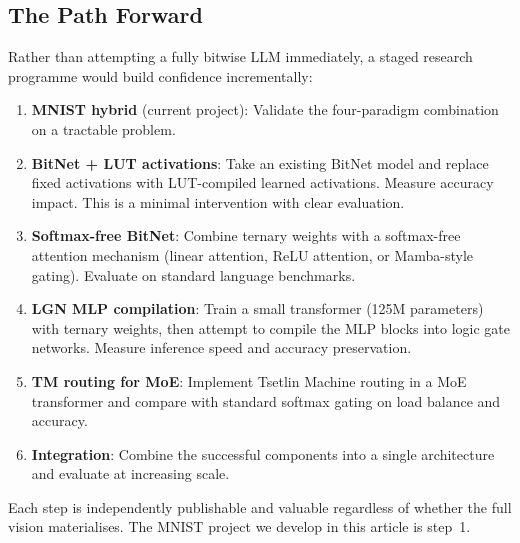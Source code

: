 \subsection{The Path Forward}
\label{sec:path-forward-llms}

Rather than attempting a fully bitwise LLM immediately, a staged
research programme would build confidence incrementally:

\begin{enumerate}[leftmargin=2em]
  \item \textbf{MNIST hybrid} (current project): Validate the
    four-paradigm combination on a tractable problem.

  \item \textbf{BitNet + LUT activations}: Take an existing BitNet
    model and replace fixed activations with LUT-compiled learned
    activations. Measure accuracy impact. This is a minimal
    intervention with clear evaluation.

  \item \textbf{Softmax-free BitNet}: Combine ternary weights with
    a softmax-free attention mechanism (linear attention, ReLU
    attention, or Mamba-style gating). Evaluate on standard language
    benchmarks.

  \item \textbf{LGN MLP compilation}: Train a small transformer
    (125M parameters) with ternary weights, then attempt to compile
    the MLP blocks into logic gate networks. Measure inference
    speed and accuracy preservation.

  \item \textbf{TM routing for MoE}: Implement Tsetlin Machine
    routing in a MoE transformer and compare with standard softmax
    gating on load balance and accuracy.

  \item \textbf{Integration}: Combine the successful components
    into a single architecture and evaluate at increasing scale.
\end{enumerate}

Each step is independently publishable and valuable regardless of
whether the full vision materialises. The MNIST project we develop
in this article is step~1.
